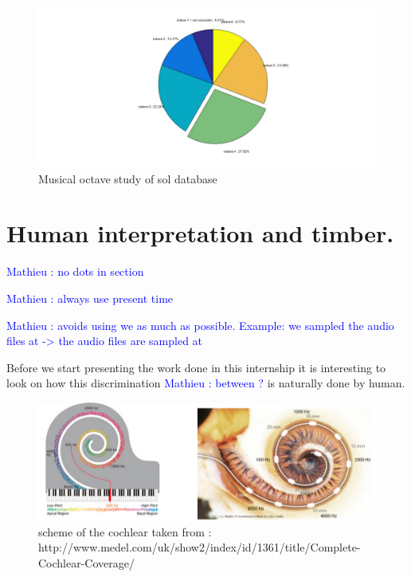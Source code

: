 \documentclass[hidelinks,12pt]{report}
\newcommand{\ml}[1]{\textcolor{blue}{ Mathieu : #1}}
\begin{document}
\begin{figure}[t!]
  
  \centering
	    \includegraphics[width=1\textwidth]{byoctave}
    \caption{Musical octave study of sol database}
\end{figure}


\section{Human interpretation and timber.}

\ml{no dots in section}

\ml{always use present time}

\ml{avoids using we as much as possible. Example: we sampled the audio files at -> the audio files are sampled at}

Before we start presenting the work done in this internship it is interesting to look on how this discrimination \ml{between ?} is naturally done by human.\par
\begin{figure}[t!]
  
  \centering
	    \includegraphics[width=1\textwidth]{cochlear}
    \caption{scheme of the cochlear taken from : http://www.medel.com/uk/show2/index/id/1361/title/Complete-Cochlear-Coverage/}
\end{figure}
\end{document}

